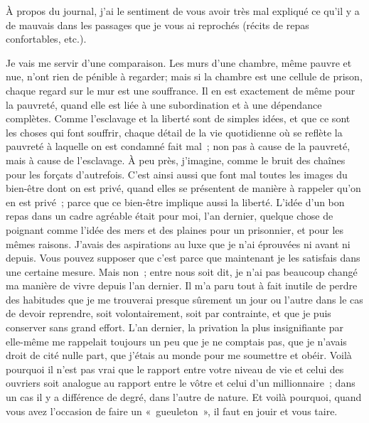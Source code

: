 \documentclass[french,twoside]{book} %
\begin{document}
À propos du journal, j'ai le sentiment de vous avoir très mal expliqué ce qu'il y a de mauvais dans les passages que je vous ai reprochés (récits de repas confortables, etc.).\par
Je vais me servir d'une comparaison. Les murs d'une chambre, même pauvre et nue, n'ont rien de pénible à regarder; mais si la chambre est une cellule de prison, chaque regard sur le mur est une souffrance. Il en est exactement de même pour la pauvreté, quand elle est liée à une subordination et à une dépendance complètes. Comme l'esclavage et la liberté sont de simples idées, et que ce sont les choses qui font souffrir, chaque détail de la vie quotidienne où se reflète la pauvreté à laquelle on est condamné fait mal ; non pas à cause de la pauvreté, mais à cause de l'esclavage. À peu près, j'imagine, comme le bruit des chaînes pour les forçats d'autrefois. C'est ainsi aussi que font mal toutes les images du bien-être dont on est privé, quand elles se présentent de manière à rappeler qu'on en est privé ; parce que ce bien-être implique aussi la liberté. L'idée d'un bon repas dans un cadre agréable était pour moi, l'an dernier, quelque chose de poignant comme l'idée des mers et des plaines pour un prisonnier, et pour les mêmes raisons. J'avais des aspirations au luxe que je n'ai éprouvées ni avant ni depuis. Vous pouvez supposer que c'est parce que maintenant je les satisfais dans une certaine mesure. Mais non ; entre nous soit dit, je n'ai pas beaucoup changé ma manière de vivre depuis l'an dernier. Il m'a paru tout à fait inutile de perdre des habitudes que je me trouverai presque sûrement un jour ou l'autre dans le cas de devoir reprendre, soit volontairement, soit par contrainte, et que je puis conserver sans grand effort. L'an dernier, la privation la plus insignifiante par elle-même me rappelait toujours un peu que je ne comptais pas, que je n'avais droit de cité nulle part, que j'étais au monde pour me soumettre et obéir. Voilà pourquoi il n'est pas vrai que le rapport entre votre niveau de vie et celui des ouvriers soit analogue au rapport entre le vôtre et celui d'un millionnaire ; dans un cas il y a différence de degré, dans l'autre de nature. Et voilà pourquoi, quand vous avez l'occasion de faire un « gueuleton », il faut en jouir et vous taire.\par
\end{document}
